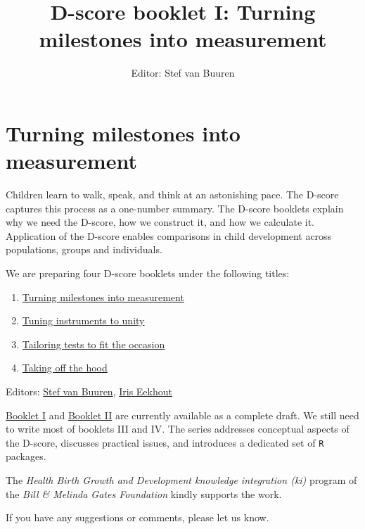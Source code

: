 \documentclass[
]{book}
\title{D-score booklet I: Turning milestones into measurement}
\author{Editor: Stef van Buuren}
\date{}
\providecommand{\tightlist}{%
  \setlength{\itemsep}{0pt}\setlength{\parskip}{0pt}}
\begin{document}
\maketitle

{
\setcounter{tocdepth}{1}
\tableofcontents
}
\hypertarget{turning-milestones-into-measurement}{%
\chapter*{Turning milestones into measurement}\label{turning-milestones-into-measurement}}

Children learn to walk, speak, and think at an astonishing pace. The D-score captures this process as a one-number summary. The D-score booklets explain why we need the D-score, how we construct it, and how we calculate it. Application of the D-score enables comparisons in child development across populations, groups and individuals.

We are preparing four D-score booklets under the following titles:

\begin{enumerate}
\def\labelenumi{\Roman{enumi}.}
\tightlist
\item
  \href{https://d-score.org/dbook1}{Turning milestones into measurement}
\item
  \href{https://d-score.org/dbook2}{Tuning instruments to unity}
\item
  \href{https://stefvanbuuren.name/dbook3}{Tailoring tests to fit the occasion}
\item
  \href{https://stefvanbuuren.name/dbook4}{Taking off the hood}
\end{enumerate}

Editors: \href{https://stefvanbuuren.name}{Stef van Buuren}, \href{https://www.iriseekhout.com}{Iris Eekhout}

\href{https://d-score.org/dbook1}{Booklet I} and \href{https://d-score.org/dbook2}{Booklet II} are currently available as a complete draft. We still need to write most of booklets III and IV. The series addresses conceptual aspects of the D-score, discusses practical issues, and introduces a dedicated set of \texttt{R} packages.

The \emph{Health Birth Growth and Development knowledge integration (ki)} program of the \emph{Bill \& Melinda Gates Foundation} kindly supports the work.

If you have any suggestions or comments, please let us know.
\end{document}
